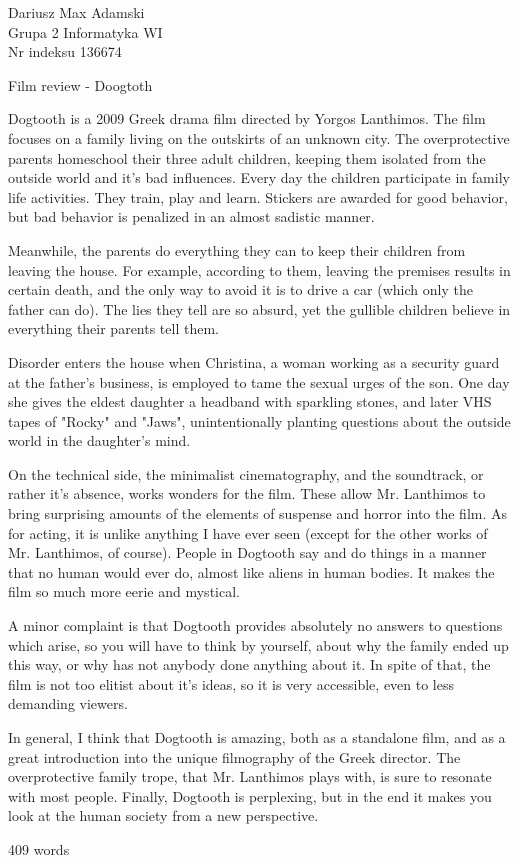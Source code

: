 \documentclass[12pt]{article}
\begin{document}
\begin{flushleft} 
	Dariusz Max Adamski \\
	Grupa 2 Informatyka WI\\
	Nr indeksu 136674
\end{flushleft}

\begin{center} 
	\vspace{0.8cm} \Large
	Film review - Doogtoth
	\vspace{0.5cm}
\end{center}

Dogtooth is a 2009 Greek drama film directed by Yorgos Lanthimos. The film focuses on a family living on the outskirts of an unknown city. The overprotective parents homeschool their three adult children, keeping them isolated from the outside world and it's bad influences. Every day the children participate in family life activities. They train, play and learn. Stickers are awarded for good behavior, but bad behavior is penalized in an almost sadistic manner.

Meanwhile, the parents do everything they can to keep their children from leaving the house. For example, according to them, leaving the premises results in certain death, and the only way to avoid it is to drive a car (which only the father can do). The lies they tell are so absurd, yet the gullible children believe in everything their parents tell them.

Disorder enters the house when Christina, a woman working as a security guard at the father's business, is employed to tame the sexual urges of the son. One day she gives the eldest daughter a headband with sparkling stones, and later VHS tapes of "Rocky" and "Jaws", unintentionally planting questions about the outside world in the daughter's mind.

On the technical side, the minimalist cinematography, and the soundtrack, or rather it's absence, works wonders for the film. These allow Mr. Lanthimos to bring surprising amounts of the elements of suspense and horror into the film. As for acting, it is unlike anything I have ever seen (except for the other works of Mr. Lanthimos, of course). People in Dogtooth say and do things in a manner that no human would ever do, almost like aliens in human bodies. It makes the film so much more eerie and mystical.

A minor complaint is that Dogtooth provides absolutely no answers to questions which arise, so you will have to think by yourself, about why the family ended up this way, or why has not anybody done anything about it. In spite of that, the film is not too elitist about it's ideas, so it is very accessible, even to less demanding viewers.

\pagebreak

In general, I think that Dogtooth is amazing, both as a standalone film, and as a great introduction into the unique filmography of the Greek director. The overprotective family trope, that Mr. Lanthimos plays with, is sure to resonate with most people. Finally, Dogtooth is perplexing, but in the end it makes you look at the human society from a new perspective.

409 words
\end{document}
